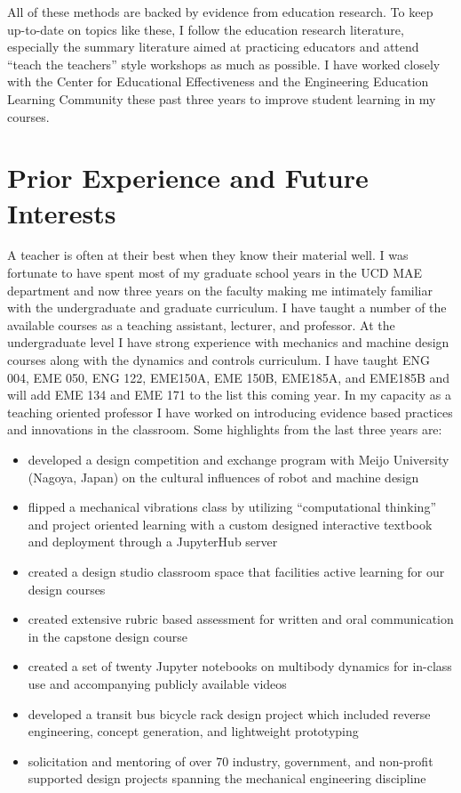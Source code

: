 \documentclass{article}
\begin{document}
All of these methods are backed by evidence from education research. To keep
up-to-date on topics like these, I follow the education research literature,
especially the summary literature aimed at practicing educators and attend
``teach the teachers'' style workshops as much as possible. I have worked
closely with the Center for Educational Effectiveness and the Engineering
Education Learning Community these past three years to improve student learning
in my courses.

\section*{Prior Experience and Future Interests}
%
A teacher is often at their best when they know their material well. I was
fortunate to have spent most of my graduate school years in the UCD MAE
department and now three years on the faculty making me intimately familiar
with the undergraduate and graduate curriculum. I have taught a number of the
available courses as a teaching assistant, lecturer, and professor. At the
undergraduate level I have strong experience with mechanics and machine design
courses along with the dynamics and controls curriculum. I have taught ENG 004,
EME 050, ENG 122, EME150A, EME 150B, EME185A, and EME185B and will add EME 134
and EME 171 to the list this coming year. In my capacity as a teaching oriented
professor I have worked on introducing evidence based practices and innovations
in the classroom. Some highlights from the last three years are:

\begin{itemize}
    \setlength\itemsep{0.1em}
  \item developed a design competition and exchange program with Meijo
    University (Nagoya, Japan) on the cultural influences of robot and machine
    design
  \item flipped a mechanical vibrations class by utilizing ``computational
    thinking'' and project oriented learning with a custom designed interactive
    textbook and deployment through a JupyterHub server
  \item created a design studio classroom space that facilities active learning
    for our design courses
  \item created extensive rubric based assessment for written and oral
    communication in the capstone design course
  \item created a set of twenty Jupyter notebooks on multibody dynamics for
    in-class use and accompanying publicly available videos
  \item developed a transit bus bicycle rack design project which included
    reverse engineering, concept generation, and lightweight prototyping
  \item solicitation and mentoring of over 70 industry, government, and
    non-profit supported design projects spanning the mechanical engineering
    discipline
\end{itemize}
\end{document}
